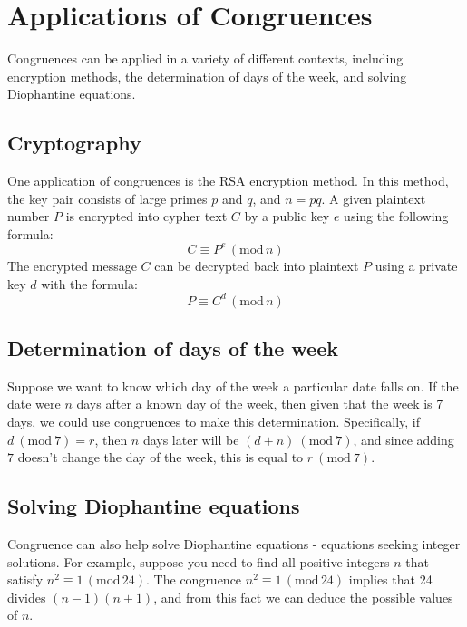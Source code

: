 \section{Applications of Congruences}

Congruences can be applied in a variety of different contexts, including encryption methods, the determination of days of the week, and solving Diophantine equations.

\subsection{Cryptography}

One application of congruences is the RSA encryption method. In this method, the key pair consists of large primes $p$ and $q$, and $n = pq$. A given plaintext number $P$ is encrypted into cypher text $C$ by a public key $e$ using the following formula:
\begin{equation}
C \equiv P^e \, (\mathrm{mod}\, n)
\end{equation}
The encrypted message $C$ can be decrypted back into plaintext $P$ using a private key $d$ with the formula:
\begin{equation}
P \equiv C^d \, (\mathrm{mod}\, n)
\end{equation}

\subsection{Determination of days of the week}

Suppose we want to know which day of the week a particular date falls on. If the date were $n$ days after a known day of the week, then given that the week is 7 days, we could use congruences to make this determination. Specifically, if $d~ (\mathrm{mod}~ 7) = r$, then $n$ days later will be $(d+n)~ (\mathrm{mod}~7)$, and since adding $7$ doesn't change the day of the week, this is equal to $r~ (\mathrm{mod}~7)$.

\subsection{Solving Diophantine equations}

Congruence can also help solve Diophantine equations - equations seeking integer solutions. For example, suppose you need to find all positive integers $n$ that satisfy $n^2 \equiv 1\, (\mathrm{mod}\, 24)$. The congruence $n^2 \equiv 1\, (\mathrm{mod}\, 24)$ implies that 24 divides $(n-1)(n+1)$, and from this fact we can deduce the possible values of $n$.

